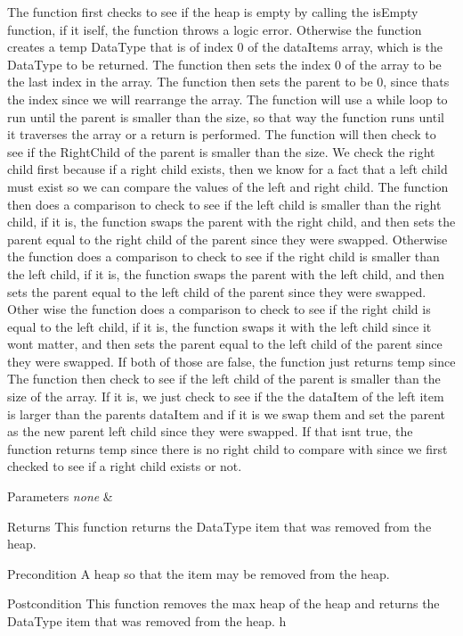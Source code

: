 The function first checks to see if the heap is empty by calling the is\+Empty function, if it iself, the function throws a logic error. Otherwise the function creates a temp Data\+Type that is of index 0 of the data\+Items array, which is the Data\+Type to be returned. The function then sets the index 0 of the array to be the last index in the array. The function then sets the parent to be 0, since thats the index since we will rearrange the array. The function will use a while loop to run until the parent is smaller than the size, so that way the function runs until it traverses the array or a return is performed. The function will then check to see if the Right\+Child of the parent is smaller than the size. We check the right child first because if a right child exists, then we know for a fact that a left child must exist so we can compare the values of the left and right child. The function then does a comparison to check to see if the left child is smaller than the right child, if it is, the function swaps the parent with the right child, and then sets the parent equal to the right child of the parent since they were swapped. Otherwise the function does a comparison to check to see if the right child is smaller than the left child, if it is, the function swaps the parent with the left child, and then sets the parent equal to the left child of the parent since they were swapped. Other wise the function does a comparison to check to see if the right child is equal to the left child, if it is, the function swaps it with the left child since it wont matter, and then sets the parent equal to the left child of the parent since they were swapped. If both of those are false, the function just returns temp since The function then check to see if the left child of the parent is smaller than the size of the array. If it is, we just check to see if the the data\+Item of the left item is larger than the parent\textquotesingle{}s data\+Item and if it is we swap them and set the parent as the new parent left child since they were swapped. If that isn\textquotesingle{}t true, the function returns temp since there is no right child to compare with since we first checked to see if a right child exists or not.


\begin{DoxyParams}{Parameters}
{\em none} & \\
\hline
\end{DoxyParams}
\begin{DoxyReturn}{Returns}
This function returns the Data\+Type item that was removed from the heap.
\end{DoxyReturn}
\begin{DoxyPrecond}{Precondition}
A heap so that the item may be removed from the heap. 
\end{DoxyPrecond}
\begin{DoxyPostcond}{Postcondition}
This function removes the max heap of the heap and returns the Data\+Type item that was removed from the heap. h 
\end{DoxyPostcond}
